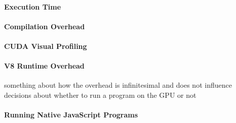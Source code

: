 \paragraph{Execution Time}
\paragraph{Compilation Overhead}
\paragraph{CUDA Visual Profiling}
\paragraph{V8 Runtime Overhead}
something about how the overhead is infinitesimal and does not influence
decisions about whether to run a program on the GPU or not
\paragraph{Running Native JavaScript Programs}


